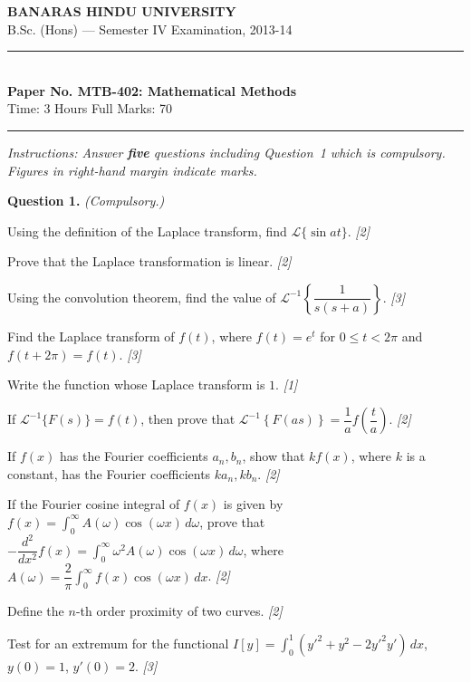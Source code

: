 \documentclass[11pt,a4paper]{article}
\newcommand{\pts}[1]{\hfill   \textit{[#1]}}
\begin{document}
\begin{center}
  {\large\bfseries BANARAS HINDU UNIVERSITY}\\[2pt]
  {\normalsize B.Sc. (Hons) --- Semester IV Examination, 2013-14}\\[6pt]
  \rule{0.8\linewidth}{0.5pt}\\[6pt]
  {\large\bfseries Paper No. MTB-402: Mathematical Methods}\\[4pt]
  {\normalsize Time: 3 Hours \hfill Full Marks: 70}
\end{center}
\rule{\linewidth}{0.4pt}
\smallskip



\noindent   \textit{Instructions: Answer   \textbf{five} questions including Question~1 which is compulsory. Figures in right-hand margin indicate marks.}
\bigskip




\noindent   \textbf{Question 1.}   \textit{(Compulsory.)}

\begin{parts}
  \item Using the definition of the Laplace transform, find $\mathcal{L}\{\sin at\}$. \pts{2}
  \item Prove that the Laplace transformation is linear. \pts{2}
  \item Using the convolution theorem, find the value of $\mathcal{L}^{-1}\!\left\{\dfrac{1}{s(s+a)}\right\}$. \pts{3}
  \item Find the Laplace transform of $f(t)$, where $f(t) = e^t$ for $0 \le t < 2\pi$ and $f(t + 2\pi) = f(t)$. \pts{3}
  \item Write the function whose Laplace transform is $1$. \pts{1}
  \item If $\mathcal{L}^{-1}\{F(s)\} = f(t)$, then prove that $\mathcal{L}^{-1}\!\left\{F(as)\right\} = \dfrac{1}{a}f\!\left(\dfrac{t}{a}\right)$. \pts{2}
  \item If $f(x)$ has the Fourier coefficients $a_n, b_n$, show that $kf(x)$, where $k$ is a constant, has the Fourier coefficients $ka_n, kb_n$. \pts{2}
  \item If the Fourier cosine integral of $f(x)$ is given by $f(x) = \int_0^\infty A(\omega)\cos(\omega x)\,d\omega$, prove that $-\dfrac{d^2}{d x^2}f(x) = \int_0^\infty \omega^2 A(\omega)\cos(\omega x)\,d\omega$, where $A(\omega) = \dfrac{2}{\pi}\int_0^\infty f(x)\cos(\omega x)\,dx$. \pts{2}
  \item Define the $n$-th order proximity of two curves. \pts{2}
  \item Test for an extremum for the functional $I[y] = \int_0^1 (y'^2 + y^2 - 2y'^2 y')\,dx$, $y(0) = 1$, $y'(0) = 2$. \pts{3}
\end{parts}
\end{document}
